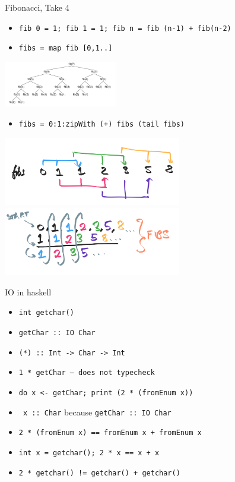 \documentclass[8pt]{beamer}
\newcommand{\cpp}[1]{\texttt{#1}}
\newcommand{\hs}[1]{\texttt{#1}}
\begin{document}
\begin{frame}[fragile]{Fibonacci, Take 4}
\pause
\begin{itemize}
\item \hs{fib 0 = 1; fib 1 = 1; fib n = fib (n-1) + fib(n-2)}
\item \hs{fibs = map fib [0,1..]}
\end{itemize}
\pause
\includegraphics[height=2cm]{./fib-repeated-work.png}
\pause
\begin{itemize}
\item \hs{fibs = 0:1:zipWith (+) fibs (tail fibs)}
\end{itemize}
\includegraphics[height=3cm]{./demand-fibs.png}
\includegraphics[height=3cm]{./eval-demand-fibs.png}
\end{frame}





\begin{frame}[fragile]{IO in haskell}
\begin{itemize}
    \item \cpp{int getchar()} \pause
    \item \hs{getChar :: IO Char} \pause
    \item \hs{(*) :: Int -> Char -> Int} \pause
    \item \hs{1 * getChar -- does not typecheck} \pause
    \item \hs{do x <- getChar; print (2 * (fromEnum x))} \pause
    \item \hs{  x :: Char} because \hs{getChar :: IO Char}
    \item \hs{2 * (fromEnum x) == fromEnum x + fromEnum x}\pause
    \item \cpp{int x = getchar(); 2 * x == x + x}\pause
    \item \cpp{2 * getchar() != getchar() + getchar()}
\end{itemize}
\end{frame}
\end{document}

